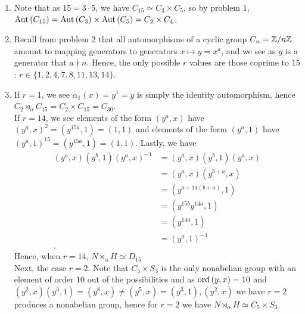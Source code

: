 \documentclass[a4paper]{article}
\begin{document}
\begin{solution}
	\begin{enumerate}
		\item Note that as \(15 = 3\cdot 5\), we have \(C_{15} \simeq C_3 \times C_5\), so by problem \(1\), \(\operatorname{Aut} \left( C_{15} \right)  = \operatorname{Aut} \left( C_3 \right) \times \operatorname{Aut} \left( C_5 \right)  = C_2 \times C_4\).
			\item Recall from problem \(2\) that all automorphisms of a cyclic group \(C_{n} = \mathbb{Z} / n\mathbb{Z}\) amount to mapping generators to generators \(x \mapsto y = x^{a}\), and we see as \(y\) is a generator that \(a \nmid n\). Hence, the only possible \(r\) values are those coprime to \(15\): \(r \in \{1, 2, 4,  7, 8, 11, 13, 14 \} \).
			\item If \(r = 1\), we see \(\alpha_1 \left( x \right)  = y^{1} = y\) is simply the identity automorphism, hence \(C_2 \rtimes_{\alpha} C_{15} = C_2 \times C_{15} = C_{30}\).\\
				If \(r = 14\), we see elements of the form \(\left( y^{a}, x \right) \) have \(\left( y^{a}, x \right) ^2 = \left( y^{15a}, 1 \right) = \left( 1, 1 \right)  \) and elements of the form \(\left( y^{a}, 1 \right) \) have \(\left( y^{a}, 1 \right) ^{15} = \left( y^{15a}, 1 \right)  = \left( 1, 1 \right) \). Lastly, we have
				\begin{align*}
					\left( y^{a}, x \right) \left( y^{b}, 1 \right) \left( y^{a}, x \right) ^{-1} &=  \left( y^{a}, x \right) \left( y^{b}, 1 \right)\left( y^{a}, x \right)    \\
														      &= \left( y^{a}, x \right)\left( y^{b + a}, x\right)   \\
														      &= \left( y^{a + 14\left( b + a \right)},1 \right)  \\
														      &= \left( y^{15b}y^{14a}, 1 \right)\\
														      &= \left( y^{14a}, 1 \right)  \\
														      &= \left( y^{a}, 1 \right)^{-1}  \\
				.\end{align*}
				Hence, when \(r = 14\), \( N \rtimes_{\alpha} H \simeq D_{15}\)\\

				Next, the case \(r = 2\). Note that \(C_5 \times S_3\) is the only nonabelian group with an element of order \(10\) out of the possibilities and as \(\operatorname{ord}\left( y, x \right) = 10 \) and \(\left( y^2, x \right) \left( y^3, 1 \right)  = \left( y^{8}, x \right) \neq \left( y^{5}, x \right)  = \left( y^3,1 \right), \left( y^2, x \right)   \) we have \(r = 2\) produces a nonabelian group, hence for \(r = 2\) we have \(N \rtimes_{\alpha} H \simeq C_5 \times S_3\).\\


\end{enumerate}
\end{solution}
\end{document}
